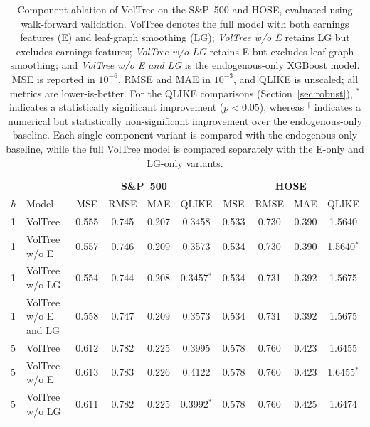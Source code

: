 \documentclass[runningheads,a4paper]{llncs}
\begin{document}
\begin{table}[!t]
\centering
\caption{Component ablation of VolTree on the S\&P~500 and HOSE, evaluated using
walk-forward validation. VolTree denotes the full model with both earnings features (E) and leaf-graph smoothing (LG);
\emph{VolTree w/o E} retains LG but excludes earnings features; \emph{VolTree w/o LG} retains E but
excludes leaf-graph smoothing; and \emph{VolTree w/o E and LG} is the endogenous-only XGBoost model. MSE is reported in $10^{-6}$, RMSE and MAE in
$10^{-3}$, and QLIKE is unscaled; all metrics are lower-is-better. For the QLIKE comparisons (Section~\ref{sec:robust}), $^{*}$ indicates a
statistically significant improvement ($p<0.05$), whereas $^{\dagger}$ indicates a numerical but
statistically non-significant improvement over the endogenous-only baseline. Each single-component variant
is compared with the endogenous-only baseline, while the full VolTree model is compared separately with the
E-only and LG-only variants.}
\label{tab:detail}
\scriptsize
\setlength{\tabcolsep}{3pt}
\begin{tabular}{ll cccc cccc}
\toprule
& & \multicolumn{4}{c}{\textbf{S\&P~500}} & \multicolumn{4}{c}{\textbf{HOSE}} \\
\cmidrule(lr){3-6}\cmidrule(lr){7-10}
$h$ & Model & MSE & RMSE & MAE & QLIKE & MSE & RMSE & MAE & QLIKE \\
\midrule
1 & VolTree              & 0.555 & 0.745 & 0.207 & 0.3458 & 0.533 & 0.730 & 0.390 & 1.5640 \\
1 & VolTree w/o E        & 0.557 & 0.746 & 0.209 & 0.3573 & 0.534 & 0.730 & 0.390 & 1.5640$^{*}$ \\
1 & VolTree w/o LG       & 0.554 & 0.744 & 0.208 & 0.3457$^{*}$ & 0.534 & 0.731 & 0.392 & 1.5675 \\
1 & VolTree w/o E and LG & 0.558 & 0.747 & 0.209 & 0.3573 & 0.534 & 0.731 & 0.392 & 1.5675 \\
\midrule
5 & VolTree              & 0.612 & 0.782 & 0.225 & 0.3995 & 0.578 & 0.760 & 0.423 & 1.6455 \\
5 & VolTree w/o E        & 0.613 & 0.783 & 0.226 & 0.4122 & 0.578 & 0.760 & 0.423 & 1.6455$^{*}$ \\
5 & VolTree w/o LG       & 0.611 & 0.782 & 0.225 & 0.3992$^{*}$ & 0.578 & 0.760 & 0.425 & 1.6474 \\

\end{tabular}
\end{table}
\end{document}
